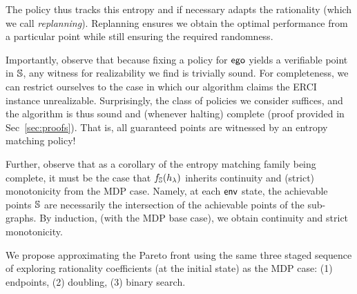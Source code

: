 The policy thus tracks this entropy and if necessary adapts the rationality (which we call \emph{replanning}). 
Replanning ensures we obtain the optimal performance from a particular point while still ensuring the required randomness.
%

Importantly, observe that because
fixing a policy for $\mathsf{ego}$ yields a verifiable point in $\mathbb{S}$, any witness
for realizability we find is trivially sound. For completeness, we can
restrict ourselves to the case in which our algorithm claims the ERCI
instance unrealizable. Surprisingly, the class of policies we consider
suffices, and the algorithm is thus sound and (whenever halting)
complete (proof provided in Sec~\ref{sec:proofs}). That is, all
guaranteed points are witnessed by an entropy matching policy!

Further, observe that as a corollary of the entropy matching family
being complete, it must be the case that $f_\mathbb{S}(h_\lambda)$
inherits continuity and (strict) monotonicity from the MDP
case. Namely, at each $\mathsf{env}$ state, the achievable points
$\mathbb{S}$ are necessarily the intersection of the achievable points
of the sub-graphs. By induction, (with the MDP base case), we obtain
continuity and strict monotonicity.


We propose approximating the  Pareto front using the same three staged sequence of exploring 
rationality coefficients (at the initial state) as the MDP case: (1) endpoints, (2) doubling,
(3) binary search.


